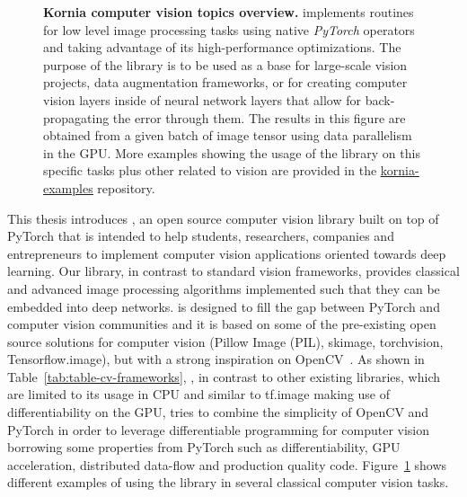 \begin{figure}[!h]
\begin{center}
\begin{tabular}{c c c c c}
        \end{tabular}
    \end{center}
    \caption[Kornia computer vision topics overview]{\textbf{Kornia computer vision topics overview.} \lib{} implements routines for low level image processing tasks using native \textit{PyTorch} operators and taking advantage of its high-performance optimizations. The purpose of the library is to be used as a base for large-scale vision projects, data augmentation frameworks, or for creating computer vision layers inside of neural network layers that allow for back-propagating the error through them. The results in this figure are obtained from a given batch of image tensor using data parallelism in the GPU. More examples showing the usage of the library on this specific tasks plus other related to vision are provided in the \underline{\color{blue}\href{https://github.com/kornia/kornia-examples}{kornia-examples}} repository.}
    \label{fig:imgproc}
\end{figure}

This thesis introduces \lib, an open source computer vision library built on top of PyTorch that is intended to help students, researchers, companies and entrepreneurs to implement computer vision applications oriented towards deep learning. Our library, in contrast to standard vision frameworks, provides classical and advanced image processing algorithms implemented such that they can be embedded into deep networks. \lib{} is designed to fill the gap between PyTorch and computer vision communities and it is based on some of the pre-existing open source solutions for computer vision (Pillow Image (PIL), skimage, torchvision, Tensorflow.image), but with a strong inspiration on OpenCV~\citep{opencv}. As shown in Table~\ref{tab:table-cv-frameworks}, \lib{}, in contrast to other existing libraries, which are limited to its usage in CPU and similar to tf.image making use of differentiability on the GPU, tries to combine the simplicity of OpenCV and PyTorch in order to leverage differentiable programming for computer vision  borrowing some properties from PyTorch such as differentiability, GPU acceleration, distributed data-flow and production quality code. Figure~\ref{fig:imgproc} shows different examples of using the library in several classical computer vision tasks. 

